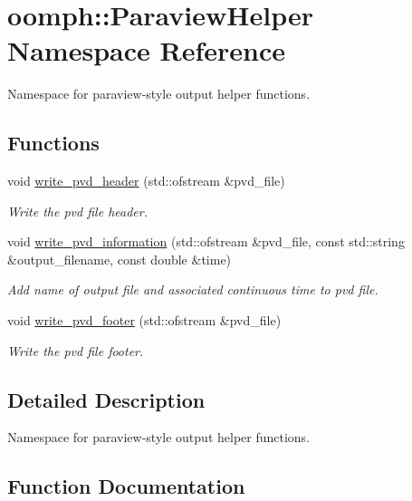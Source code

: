 \hypertarget{namespaceoomph_1_1ParaviewHelper}{}\section{oomph\+:\+:Paraview\+Helper Namespace Reference}
\label{namespaceoomph_1_1ParaviewHelper}


Namespace for paraview-\/style output helper functions.  


\subsection*{Functions}
\begin{DoxyCompactItemize}
\item 
void \hyperlink{namespaceoomph_1_1ParaviewHelper_a5e200ee35119c91fb4ab83ddf5d55373}{write\+\_\+pvd\+\_\+header} (std\+::ofstream \&pvd\+\_\+file)
\begin{DoxyCompactList}\small\item\em Write the pvd file header. \end{DoxyCompactList}\item 
void \hyperlink{namespaceoomph_1_1ParaviewHelper_a970f03dfd06efb8efd2cfcc8d7a5c371}{write\+\_\+pvd\+\_\+information} (std\+::ofstream \&pvd\+\_\+file, const std\+::string \&output\+\_\+filename, const double \&time)
\begin{DoxyCompactList}\small\item\em Add name of output file and associated continuous time to pvd file. \end{DoxyCompactList}\item 
void \hyperlink{namespaceoomph_1_1ParaviewHelper_a41a4f292c2f1f0b10755d940e3aeadad}{write\+\_\+pvd\+\_\+footer} (std\+::ofstream \&pvd\+\_\+file)
\begin{DoxyCompactList}\small\item\em Write the pvd file footer. \end{DoxyCompactList}\end{DoxyCompactItemize}


\subsection{Detailed Description}
Namespace for paraview-\/style output helper functions. 

\subsection{Function Documentation}
\mbox{\label{namespaceoomph_1_1ParaviewHelper_a41a4f292c2f1f0b10755d940e3aeadad}} 
